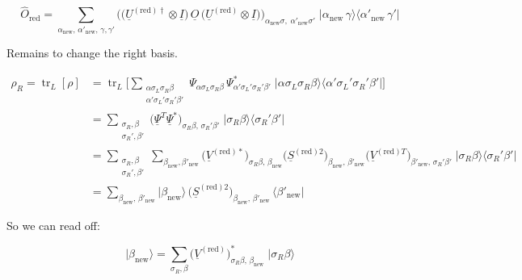 \begin{equation}
\boxed{\;\hat O_{\mathrm{red}} = \sum_{\alpha_{\mathrm{new}},\,\alpha'_{\mathrm{new}},\,\gamma,\gamma'}
\Big(\big(\underline{U}^{(\mathrm{red})\dagger}\otimes \underline{I}\big)\,\underline{O}\,\big(\underline{U}^{(\mathrm{red})}\otimes \underline{I}\big)\Big)_{\alpha_{\mathrm{new}}\sigma,\;\alpha'_{\mathrm{new}}\sigma'}\;
\big|\alpha_{\mathrm{new}}\,\gamma\big\rangle\big\langle\alpha'_{\mathrm{new}}\,\gamma'\big|\;}
\end{equation}

Remains to change the right basis.

\begin{align}
\rho_R = \operatorname{tr}_L[\rho]
&= \operatorname{tr}_L\Big[\sum_{\substack{\alpha\sigma_L\sigma_R\beta\\ \alpha'\sigma_L'\sigma_R'\beta'}}
\Psi_{\alpha\sigma_L\sigma_R\beta}\,\Psi^*_{\alpha'\sigma_L'\sigma_R'\beta'}\;
\big|\alpha\sigma_L\sigma_R\beta\big\rangle\big\langle\alpha'\sigma_L'\sigma_R'\beta'\big|\Big]\\
&= \sum_{\substack{\sigma_R,\beta\\ \sigma_R',\beta'}}
\big(\underline{\Psi}^{T}\underline{\Psi}^{*}\big)_{\sigma_R\beta,\,\sigma_R'\beta'}\;
\big|\sigma_R\beta\big\rangle\big\langle\sigma_R'\beta'\big|\\
&= \sum_{\substack{\sigma_R,\beta\\ \sigma_R',\beta'}}\sum_{\beta_{\mathrm{new}},\beta'_{\mathrm{new}}}
\big(\underline{V}^{(\mathrm{red})*}\big)_{\sigma_R\beta,\,\beta_{\mathrm{new}}}
\big(\underline{S}^{(\mathrm{red})2}\big)_{\beta_{\mathrm{new}},\,\beta'_{\mathrm{new}}}
\big(\underline{V}^{(\mathrm{red})T}\big)_{\beta'_{\mathrm{new}},\,\sigma_R'\beta'}\;
\big|\sigma_R\beta\big\rangle\big\langle\sigma_R'\beta'\big|\\
&= \sum_{\beta_{\mathrm{new}},\,\beta'_{\mathrm{new}}}
\big|\beta_{\mathrm{new}}\big\rangle\,\big(\underline{S}^{(\mathrm{red})2}\big)_{\beta_{\mathrm{new}},\,\beta'_{\mathrm{new}}}\,\big\langle\beta'_{\mathrm{new}}\big|
\end{align}

So we can read off:

\begin{equation}
\boxed{\;\big|\beta_{\mathrm{new}}\big\rangle = \sum_{\sigma_R,\beta}\big(\underline{V}^{(\mathrm{red})}\big)^{*}_{\sigma_R\beta,\,\beta_{\mathrm{new}}}\;\big|\sigma_R\beta\big\rangle\;}
\end{equation}

